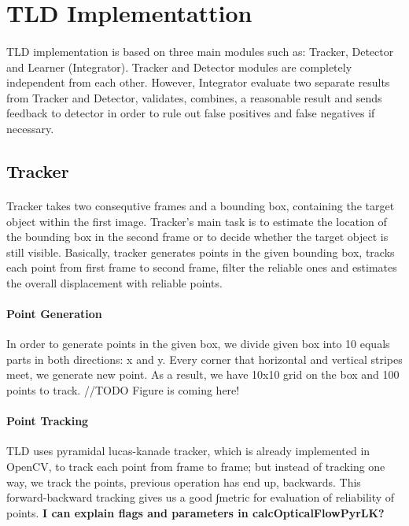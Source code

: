 \documentclass{article}
\begin{document}
    \section{TLD Implementattion}
        \paragraph{}
            TLD implementation is based on three main modules such as: Tracker, Detector and Learner (Integrator).
            Tracker and Detector modules are completely independent from each other.
            However, Integrator evaluate two separate results from Tracker and Detector, validates, combines,
            a reasonable result and sends feedback to detector in order to rule out false positives and false negatives
            if necessary.
        \subsection{Tracker}
            \paragraph{}
                Tracker takes two consequtive frames and a bounding box, containing the target object within the first image.
                Tracker's main task is to estimate the location of the bounding box in the second frame or to decide whether the
                target object is still visible. Basically, tracker generates points in the given bounding box,
                tracks each point from first frame to second frame, filter the reliable ones and estimates
                the overall displacement with reliable points.
            \paragraph{Point Generation}
                In order to generate points in the given box, we divide given box into 10 equals
                parts in both directions: x and y. Every corner that horizontal and vertical stripes meet, we generate
                new point. As a result, we have 10x10 grid on the box and 100 points to track.
                //TODO Figure is coming here!
            \paragraph{Point Tracking}
                TLD uses pyramidal lucas-kanade tracker, which is already implemented in OpenCV, to track each point from frame
                to frame; but instead of tracking one way, we track the points, previous operation has end up, backwards.
                This forward-backward tracking gives us a good ∫metric for evaluation of reliability of points.
                \textbf{I can explain flags and parameters in calcOpticalFlowPyrLK?}
\end{document}
